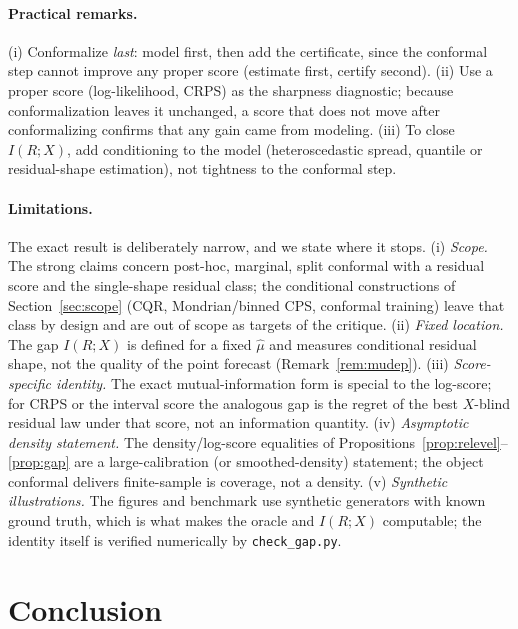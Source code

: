 \documentclass[11pt]{article}
\theoremstyle{definition}
\begin{document}
\paragraph{Practical remarks.} (i) Conformalize \emph{last}: model first, then add the
certificate, since the conformal step cannot improve any proper score (estimate first, certify
second). (ii) Use a proper score (log-likelihood, CRPS) as the sharpness diagnostic; because
conformalization leaves it unchanged, a score that does not move after conformalizing confirms
that any gain came from modeling. (iii) To close $I(R;X)$, add conditioning to the model
(heteroscedastic spread, quantile or residual-shape estimation), not tightness to the
conformal step.

\paragraph{Limitations.} The exact result is deliberately narrow, and we state where it
stops. (i) \emph{Scope.} The strong claims concern post-hoc, marginal, split conformal with
a residual score and the single-shape residual class; the conditional constructions of
Section~\ref{sec:scope} (CQR, Mondrian/binned CPS, conformal training) leave that class by
design and are out of scope as targets of the critique. (ii) \emph{Fixed location.} The gap
$I(R;X)$ is defined for a fixed $\hat\mu$ and measures conditional residual shape, not the
quality of the point forecast (Remark~\ref{rem:mudep}). (iii) \emph{Score-specific
identity.} The exact mutual-information form is special to the log-score; for CRPS or the
interval score the analogous gap is the regret of the best $X$-blind residual law under that
score, not an information quantity. (iv) \emph{Asymptotic density statement.} The
density/log-score equalities of Propositions~\ref{prop:relevel}--\ref{prop:gap} are a
large-calibration (or smoothed-density) statement; the object conformal delivers
finite-sample is coverage, not a density. (v) \emph{Synthetic illustrations.} The figures
and benchmark use synthetic generators with known ground truth, which is what makes the
oracle and $I(R;X)$ computable; the identity itself is verified numerically by
\texttt{check\_gap.py}.

\section{Conclusion}
\end{document}
